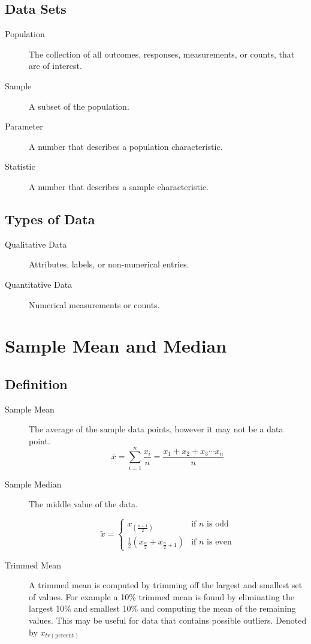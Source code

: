 \documentclass{book}
\begin{document}
\subsection{Data Sets}
\begin{description}
\item[Population] The collection of all outcomes, responses, measurements, or counts, that are of interest.

\item[Sample] A subset of the population.

\item[Parameter] A number that describes a population characteristic.

\item[Statistic] A number that describes a sample characteristic.
\end{description}

\subsection{Types of Data}

\begin{description}
\item[Qualitative Data] Attributes, labels, or non-numerical entries.

\item[Quantitative Data] Numerical measurements or counts.
\end{description}

\section{Sample Mean and Median}

\subsection{Definition}
\begin{description}
\item[Sample Mean] The average of the sample data points, however it may not be a data point.
$$\overline{x} = \sum_{i=1}^n\frac{x_i}{n} = \frac{x_1+x_2+x_3\cdots x_n}{n}$$
\item[Sample Median] The middle value of the data.

$$\tilde{x}=\left\{
\begin{matrix}
x_{(\frac{n+1}{2})} & \text{if $n$ is odd}\\
\frac{1}{2}(x_{\frac{n}{2}}+x_{\frac{n}{2}+1}) & \text{if $n$ is even}
\end{matrix}
\right.$$

\item[Trimmed Mean] A trimmed mean is computed by trimming off the largest and smallest set of values. For example a 10\% trimmed mean is found by eliminating the largest 10\% and smallest 10\% and computing the mean of the remaining values. This may be useful for data that contains possible outliers. Denoted by $x_{tr(\text{percent})}$
\end{description}
\end{document}
